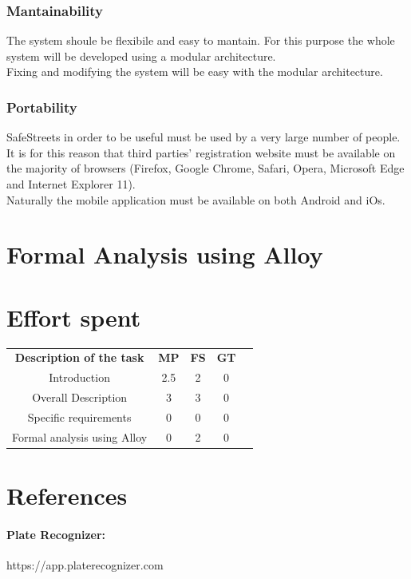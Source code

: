 \documentclass{article}
\begin{document}
\subsubsection{Mantainability}
The system shoule be flexibile and easy to mantain. For this purpose the whole
system will be developed using a modular architecture. \\
Fixing and modifying the system will be easy with the modular architecture.

\subsubsection{Portability}
SafeStreets in order to be useful must be used by a very large number of people.
It is for this reason that third parties' registration website must be available
on the majority of browsers (Firefox, Google Chrome, Safari, Opera, Microsoft
Edge and Internet Explorer 11).\\
Naturally the mobile application must be available on both Android and iOs.

\newpage
\section{Formal Analysis using Alloy}

\newpage
\section{Effort spent}
\begin{center}
    \begin{tabular}{|c|c|c|c|c|}
        \hline
        \textbf{Description of the task} & \textbf{MP} & \textbf{FS} &
        \textbf{GT} \\
        Introduction                    & 2.5   & 2     & 0     \\
        Overall Description             & 3   & 3   & 0     \\
        Specific requirements           & 0     & 0     & 0     \\
        Formal analysis using Alloy     & 0     & 2     & 0     \\
    \end{tabular}
\end{center}
\section{References}
    \paragraph{Plate Recognizer:} https://app.platerecognizer.com
    
\end{document}

